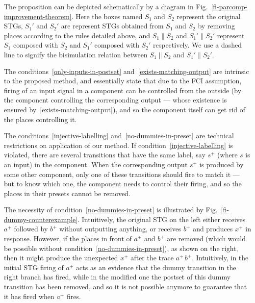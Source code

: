 The proposition can be depicted schematically by a diagram in Fig.~\ref{fi-parcomp-improvement-theorem}.
Here the boxes named $S_1$ and $S_2$ represent the original STGs, 
$S_1'$ and $S_2'$ are represent STGs obtained from $S_1$ and $S_2$ by removing places according to
 the rules detailed above, and $S_1 \parallel S_2$ and $S_1' \parallel S_2'$ represent 
$S_1$ composed with $S_2$ and $S_1'$ composed with $S_2'$ respectively. 
We use a dashed line to signify the bisimulation relation between $S_1 \parallel S_2$ and $S_1' \parallel S_2'$.

 
The conditions~\ref{only-inputs-in-postset}
and~\ref{exists-matching-output} are intrinsic to the proposed
method, and essentially state that due to the FCI assumption,
firing of an input signal in a component can be controlled from
the outside (\viz by the component controlling the
corresponding output --- whose existence is ensured
by~\ref{exists-matching-output}), and so the component itself
can get rid of the places controlling it.

The conditions~\ref{injective-labelling}
and~\ref{no-dummies-in-preset} are technical restrictions on
application of our method. If
condition~\ref{injective-labelling} is violated, there are
several transitions that have the same label, say $s^+$ (where
$s$ is an input) in the component. When the corresponding
output $s^+$ is produced by some other component, only one of
these transitions should fire to match it --- but to know which
one, the component needs to control their firing, and so the
places in their presets cannot be removed.

The necessity of condition~\ref{no-dummies-in-preset} is
illustrated by Fig.~\ref{fi-dummy-counterexample}. Intuitively,
the original STG on the left either receives $a^+$ followed by
$b^+$ without outputting anything, or receives $b^+$ and
produces $x^+$ in response. However, if the places in front of
$a^+$ and $b^+$ are removed (which would be possible without
condition~\ref{no-dummies-in-preset}), as shown on the right,
then it might produce the unexpected $x^+$ after the trace
$a^+\,b^+$. Intuitively, in the initial STG firing of $a^+$
acts as an evidence that the dummy transition in the right
branch has fired, while in the modified one the postset of this
dummy transition has been removed, and so it is not possible
anymore to guarantee that it has fired when $a^+$ fires.

